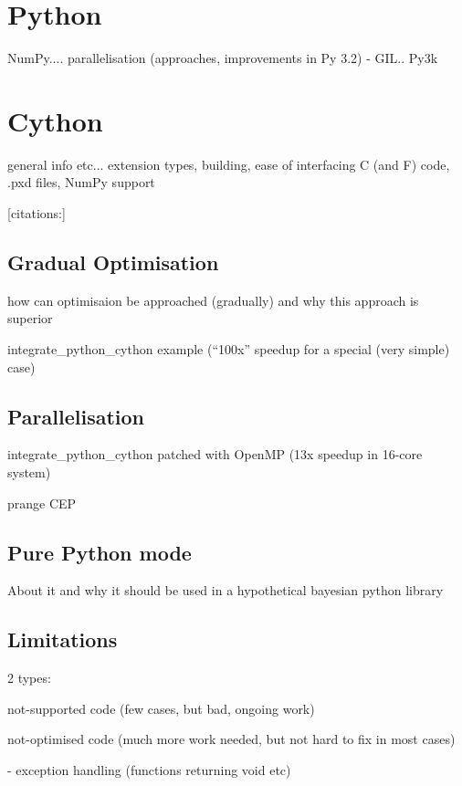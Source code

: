 \documentclass[a4paper,12pt,oneside]{report}
\begin{document}
\section{Python}

NumPy.... parallelisation (approaches, improvements in Py 3.2) - GIL.. Py3k

\section{Cython}

general info etc... extension types, building, ease of interfacing C (and F) code, .pxd files,
NumPy support

[citations:\cite{BehBraSel:09,Sel:09,BehBraCitDalSelSmi:11}]

\subsection{Gradual Optimisation}

how can optimisaion be approached (gradually) and why this approach is superior

integrate\_python\_cython example (``100x'' speedup for a special (very simple) case)

\subsection{Parallelisation}

integrate\_python\_cython patched with OpenMP (13x speedup in 16-core system)

prange CEP

\subsection{Pure Python mode}

About it and why it should be used in a hypothetical bayesian python library

\subsection{Limitations}

2 types:

	not-supported code (few cases, but bad, ongoing work)

	not-optimised code (much more work needed, but not hard to fix in most cases)

		- exception handling (functions returning void etc)
\end{document}
